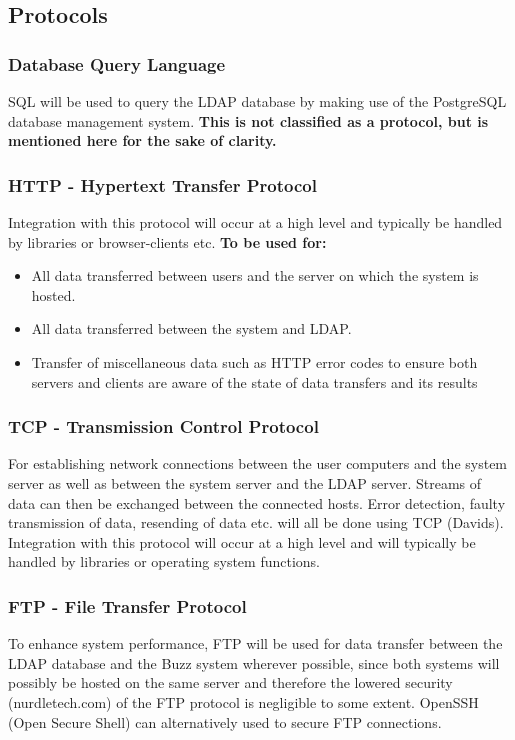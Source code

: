 \documentclass[a4paper,12pt]{report}
\begin{document}
\subsection{Protocols}
\subsubsection{Database Query Language}
	SQL will be used to query the LDAP database by making use of the PostgreSQL database management system. \textbf{This is not classified as a protocol, but is mentioned here for the sake of clarity.}
\subsubsection{HTTP - Hypertext Transfer Protocol}
Integration with this protocol will occur at a high level and typically be handled by libraries or browser-clients etc.
\textbf{To be used for:	}
	\begin{itemize}
	\item{All data transferred between users and the server on which the system is hosted.}
	\item{All data transferred between the system and LDAP.}
	\item{Transfer of miscellaneous data such as HTTP error codes to ensure both servers and clients are aware of the state of data transfers and its results}
	\end{itemize}
\subsubsection{TCP - Transmission Control Protocol}
 For establishing network connections between the user computers and the system server as well as between the system server and the LDAP server. Streams of data can then be exchanged between the connected hosts. Error detection, faulty transmission of data, resending of data etc. will all be done using TCP (Davids). Integration with this protocol will occur at a high level and will typically be handled by libraries or operating system functions.
\subsubsection{FTP - File Transfer Protocol}
To enhance system performance, FTP will be used for data transfer between the LDAP database and the Buzz system wherever possible, since both systems will possibly be hosted on the same server and therefore the lowered security (nurdletech.com) of the FTP protocol is negligible to some extent. OpenSSH (Open Secure Shell) can alternatively used to secure FTP connections.
\end{document}
